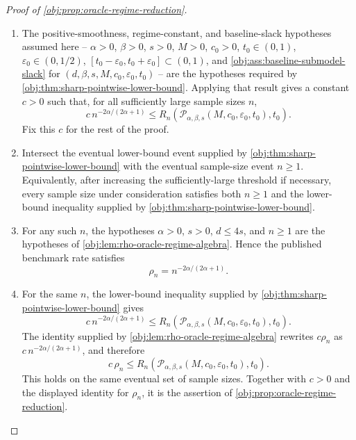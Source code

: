 \begin{proof}[Proof of \cref{obj:prop:oracle-regime-reduction}]
\begin{enumerate}
\item The positive-smoothness, regime-constant, and baseline-slack hypotheses assumed here --
\(\alpha>0\), \(\beta>0\), \(s>0\), \(M>0\), \(c_0>0\), \(t_0\in(0,1)\),
\(\varepsilon_0\in(0,1/2)\), \([t_0-\varepsilon_0,t_0+\varepsilon_0]\subset(0,1)\),
and \cref{obj:ass:baseline-submodel-slack} for \((d,\beta,s,M,c_0,\varepsilon_0,t_0)\) --
are the hypotheses required by \cref{obj:thm:sharp-pointwise-lower-bound}. Applying that result gives
a constant \(c>0\) such that, for all sufficiently large sample sizes \(n\),
\[
c\, n^{-2\alpha/(2\alpha+1)}
\le
R_n\!\left(\mathcal P_{\alpha,\beta,s}(M,c_0,\varepsilon_0,t_0),t_0\right).
\]
Fix this \(c\) for the rest of the proof. %

\item Intersect the eventual lower-bound event supplied by \cref{obj:thm:sharp-pointwise-lower-bound}
with the eventual sample-size event \(n\ge1\). Equivalently, after increasing the sufficiently-large
threshold if necessary, every sample size under consideration satisfies both \(n\ge1\) and the
lower-bound inequality supplied by \cref{obj:thm:sharp-pointwise-lower-bound}.

\item For any such \(n\), the hypotheses \(\alpha>0\), \(s>0\), \(d\le4s\), and \(n\ge1\)
are the hypotheses of \cref{obj:lem:rho-oracle-regime-algebra}. Hence the published benchmark rate
satisfies
\[
\rho_n
=
n^{-2\alpha/(2\alpha+1)} .
\]

\item For the same \(n\), the lower-bound inequality supplied by
\cref{obj:thm:sharp-pointwise-lower-bound} gives
\[
c\, n^{-2\alpha/(2\alpha+1)}
\le
R_n\!\left(\mathcal P_{\alpha,\beta,s}(M,c_0,\varepsilon_0,t_0),t_0\right).
\]
The identity supplied by \cref{obj:lem:rho-oracle-regime-algebra} rewrites \(c\rho_n\) as
\(c\,n^{-2\alpha/(2\alpha+1)}\), and therefore
\[
c\,\rho_n
\le
R_n\!\left(\mathcal P_{\alpha,\beta,s}(M,c_0,\varepsilon_0,t_0),t_0\right).
\]
This holds on the same eventual set of sample sizes. Together with \(c>0\) and the displayed identity
for \(\rho_n\), it is the assertion of \cref{obj:prop:oracle-regime-reduction}.
\end{enumerate}
\end{proof}

